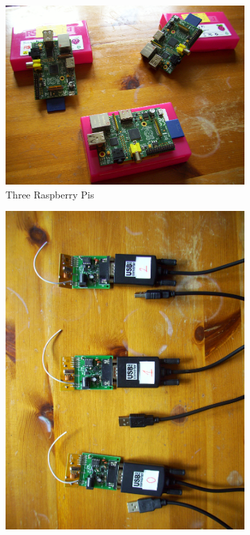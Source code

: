 \documentclass[a4paper,11pt]{scrartcl}
\begin{document}
\begin{figure}[h]
	\centering
	\begin{subfigure}[b]{0.3\textwidth}
		\includegraphics[width=\textwidth]{pis}
		\caption{Three Raspberry Pis}
	\end{subfigure}
	\begin{subfigure}[b]{0.3\textwidth}
		\includegraphics[width=\textwidth]{readers}

\end{subfigure}
\end{figure}
\end{document}
